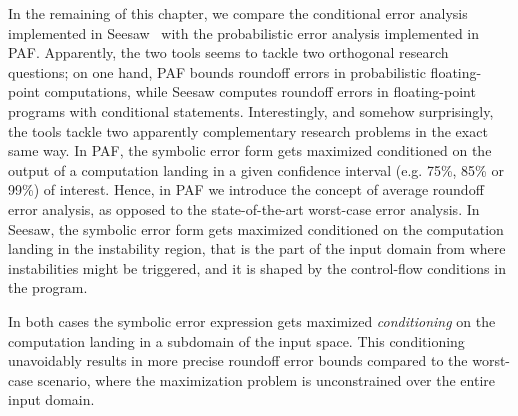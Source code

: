 In the remaining of this chapter, we compare the conditional error analysis implemented in Seesaw~\cite{seesaw} with the probabilistic error analysis implemented in PAF. 
%
Apparently, the two tools seems to tackle two orthogonal research questions; on one hand, PAF bounds roundoff errors in probabilistic floating-point computations, while Seesaw computes roundoff errors in floating-point programs with conditional statements.
%
Interestingly, and somehow surprisingly, the tools tackle two apparently complementary research problems in the exact same way.
%
In PAF, the symbolic error form gets maximized conditioned on the output of a computation landing in a given confidence interval (e.g. 75\%, 85\% or 99\%) of interest.
%
Hence, in PAF we introduce the concept of average roundoff error analysis, as opposed to the state-of-the-art worst-case error analysis.
%
In Seesaw, the symbolic error form gets maximized conditioned on the computation landing in the instability region, that is the part of the input domain from where instabilities might be triggered, and it is shaped by the control-flow conditions in the program.
%

In both cases the symbolic error expression gets maximized \emph{conditioning} on the computation landing in a subdomain of the input space.
%
This conditioning unavoidably results in more precise roundoff error bounds compared to the worst-case scenario, where the maximization problem is unconstrained over the entire input domain.
\newpage

